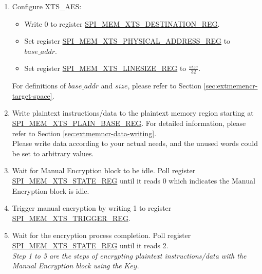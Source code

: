 \documentclass[main\_\_EN.tex]{subfiles}
\begin{document}
\begin{enumerate}

    \item Configure XTS\_AES:
    \begin{itemize}
        \item Write 0 to register \hyperref[regdesc:SPIMEMXTSDESTINATIONREG]{SPI\_MEM\_XTS\_DESTINATION\_REG}.
        \item Set register \hyperref[regdesc:SPIMEMXTSPHYSICALADDRESSREG]{SPI\_MEM\_XTS\_PHYSICAL\_ADDRESS\_REG} to \begin{math}base\_addr\end{math}.
        \item Set register \hyperref[regdesc:SPIMEMXTSLINESIZEREG]{SPI\_MEM\_XTS\_LINESIZE\_REG} to \begin{math}\frac{size}{32}\end{math}.
    \end{itemize}
    For definitions of \begin{math} base\_addr\end{math} and \begin{math}size\end{math}, please refer to Section \ref{sec:extmemencr-target-space}.

    \item Write plaintext instructions/data to the plaintext memory region starting at \hyperref[regdesc:SPIMEMXTSPLAINBASEREG]{SPI\_MEM\_XTS\_PLAIN\_BASE\_REG}. For detailed information, please refer to Section \ref{sec:extmemncr-data-writing}. \\Please write data according to your actual needs, and the unused words could be set to arbitrary values.

    \item Wait for Manual Encryption block to be idle. Poll register \hyperref[regdesc:SPIMEMXTSSTATEREG]{SPI\_MEM\_XTS\_STATE\_REG} until it reads 0 which indicates the Manual Encryption block is idle.

    \item Trigger manual encryption by writing 1 to register \hyperref[regdesc:SPIMEMXTSTRIGGERREG]{SPI\_MEM\_XTS\_TRIGGER\_REG}.

    \item Wait for the encryption process completion. Poll register \hyperref[regdesc:SPIMEMXTSSTATEREG]{SPI\_MEM\_XTS\_STATE\_REG} until it reads 2. \\ \textit{Step 1 to 5 are the steps of encrypting plaintext instructions/data with the Manual Encryption block using the} \begin{math}\mathit{Key}\end{math}.


\end{enumerate}
\end{document}
